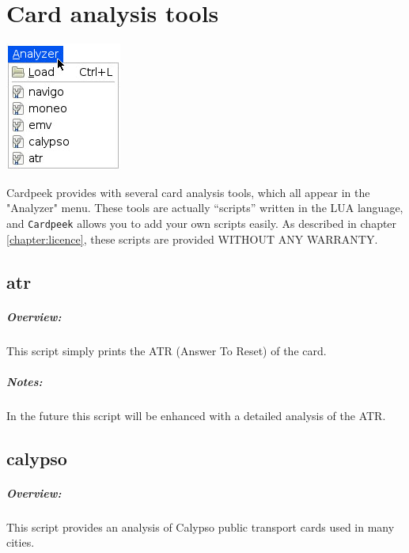 \documentclass[11pt]{report}
\begin{document}
\chapter{Card analysis tools}

\begin{center}
\includegraphics[width=.25\textwidth]{graphics/sample-menu-analyzer.jpg}
\end{center}

Cardpeek provides with several card analysis tools, which all appear in the "Analyzer" menu. 
These tools are actually ``scripts'' written in the LUA language, and \texttt{Cardpeek} allows you to add your own scripts easily.
As described in chapter \ref{chapter:licence}, these scripts are provided WITHOUT ANY WARRANTY.

\section{atr}

\paragraph{Overview:}
This script simply prints the ATR (Answer To Reset) of the card.

\paragraph{Notes:}
In the future this script will be enhanced with a detailed analysis of the ATR.

\section{calypso}

\paragraph{Overview:}
This script provides an analysis of Calypso public transport cards used in many cities.
\end{document}
